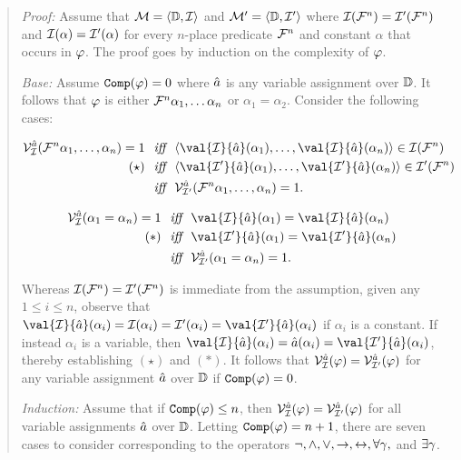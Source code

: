 \begin{quote} 
  \textit{Proof:} Assume that $\mathcal{M}=\langle\mathbb{D},\mathcal{I}\rangle$ and $\mathcal{M}'=\langle\mathbb{D},\mathcal{I}'\rangle$ where $\mathcal{I}(\mathcal{F}^n)=\mathcal{I}'(\mathcal{F}^n)$ and $\mathcal{I}(\alpha)=\mathcal{I}'(\alpha)$ for every $n$-place predicate $\mathcal{F}^n$ and constant $\alpha$ that occurs in $\varphi$.
  The proof goes by induction on the complexity of $\varphi$.

  \textit{Base:} Assume $\texttt{Comp}(\varphi)=0$ where $\hat{a}$ is any variable assignment over $\mathbb{D}$.
  It follows that $\varphi$ is either $\mathcal{F}^n\alpha_1,\ldots\alpha_n$ or $\alpha_1=\alpha_2$.
  Consider the following cases:

  \vspace{-.2in}
  \begin{align*}
    \VV{\I}{\va{a}}(\F^n\alpha_1,\ldots,\alpha_n)=1 &\textit{ ~iff~ } \tuple{\val{\I}{\va{a}}(\alpha_1),\ldots,\val{\I}{\va{a}}(\alpha_n)}\in\I(\F^n)\\
      (\star) &\textit{ ~iff~ } \tuple{\val{\I'}{\va{a}}(\alpha_1),\ldots,\val{\I'}{\va{a}}(\alpha_n)}\in\I'(\F^n)\\
      &\textit{ ~iff~ } \VV{\I'}{\va{a}}(\F^n\alpha_1,\ldots,\alpha_n)=1.
  \end{align*}

  \vspace{-.2in}
  \begin{align*}
    \VV{\I}{\va{a}}(\alpha_1=\alpha_n)=1 &\textit{ ~iff~ } \val{\I}{\va{a}}(\alpha_1) = \val{\I}{\va{a}}(\alpha_n)\\
      (\ast) &\textit{ ~iff~ } \val{\I'}{\va{a}}(\alpha_1) = \val{\I'}{\va{a}}(\alpha_n)\\
      &\textit{ ~iff~ } \VV{\I'}{\va{a}}(\alpha_1=\alpha_n)=1.
  \end{align*}

  Whereas $\mathcal{I}(\mathcal{F}^n)=\mathcal{I}'(\mathcal{F}^n)$ is immediate from the assumption, given any $1 \leq i \leq n$, observe that $\val{\I}{\va{a}}(\alpha_i)=\I(\alpha_i)=\I'(\alpha_i)=\val{\I'}{\va{a}}(\alpha_i)$ if $\alpha_i$ is a constant.
  If instead $\alpha_i$ is a variable, then $\val{\I}{\va{a}}(\alpha_i)=\va{a}(\alpha_i)=\val{\I'}{\va{a}}(\alpha_i)$, thereby establishing $(\star)$ and $(\ast)$. 
  It follows that $\mathcal{V}_{\mathcal{I}}^{\hat{a}}(\varphi)=\mathcal{V}_{\mathcal{I}'}^{\hat{a}}(\varphi)$ for any variable assignment $\hat{a}$ over $\mathbb{D}$ if $\texttt{Comp}(\varphi)=0$.

  \textit{Induction:} Assume that if $\texttt{Comp}(\varphi)\leq n$, then $\mathcal{V}_{\mathcal{I}}^{\hat{a}}(\varphi)=\mathcal{V}_{\mathcal{I}'}^{\hat{a}}(\varphi)$ for all variable assignments $\hat{a}$ over $\mathbb{D}$. 
  Letting $\texttt{Comp}(\varphi)=n+1$, there are seven cases to consider corresponding to the operators $\neg,\wedge,\vee,\rightarrow,\leftrightarrow,\forall \gamma,$ and $\exists \gamma$.


\end{quote}
